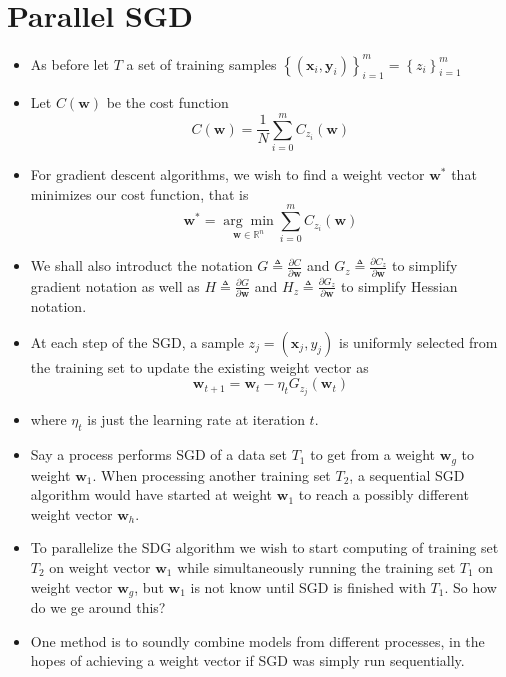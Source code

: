 \section{Parallel SGD}

\begin{itemize}
    \item As before let $T$ a set of training samples $\left\lbrace \left( \bm{x}_{i}, \bm{y}_i \right) \right\rbrace_{i=1}^{m} = \left\lbrace z_{i} \right\rbrace_{i=1}^{m}$
    \item Let $C \left( \bm{w} \right)$ be the cost function
    \[
        C \left( \bm{w} \right) = \frac{1}{N} \sum_{i=0}^{m} C_{z_{i}}\left( \bm{w} \right)
    \]
    \item For gradient descent algorithms, we wish to find a weight vector $\bm{w}^{\ast}$ that minimizes our cost function, that is
    \[
        \bm{w}^{\ast} = \underset{\bm{w} \in \mathbb{R}^{n}}{\arg \min } \sum_{i=0}^{m} C_{z_{i}}\left( \bm{w} \right)
    \]
    \item We shall also introduct the notation $G \triangleq \frac{\partial C}{\partial \bm{w}}$ and $G_{z} \triangleq \frac{\partial C_{z}}{\partial \bm{w}}$ to simplify gradient notation as well as $H \triangleq \frac{\partial G}{\partial \bm{w}}$ and $H_{z} \triangleq \frac{\partial G_{z}}{\partial \bm{w}}$ to simplify Hessian notation.
    \item At each step of the SGD, a sample $z_{j} = \left( \bm{x}_j , y_{j} \right)$ is uniformly selected from the training set to update the existing weight vector as
    \[
        \bm{w}_{t+1} = \bm{w}_{t} - \eta_{t} G_{z_{j}} \left( \bm{w}_{t} \right)
    \]
    \item where $\eta_{t}$ is just the learning rate at iteration $t$.
    \item Say a process performs SGD of a data set $T_{1}$ to get from a weight $\bm{w}_{g}$ to weight $\bm{w}_{1}$. When processing another training set $T_{2}$, a sequential SGD algorithm would have started at weight $\bm{w}_{1}$ to reach a possibly different weight vector $\bm{w}_{h}$.
    \item To parallelize the SDG algorithm we wish to start computing of training set $T_2$ on weight vector $\bm{w}_{1}$ while simultaneously running the training set $T_1$ on weight vector $\bm{w}_{g}$, but $\bm{w}_{1}$ is not know until SGD is finished with $T_1$. So how do we ge around this?
    \item One method is to soundly combine models from different processes, in the hopes of achieving a weight vector if SGD was simply run sequentially.

\end{itemize}

